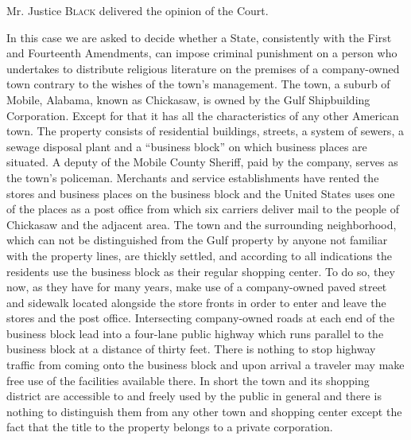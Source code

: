 
\opinion Mr. Justice \textsc{Black} delivered the opinion of the Court.

In this case we are asked to decide whether a State, consistently with the First
and Fourteenth Amendments, can impose criminal punishment on a person who
undertakes to distribute religious literature on the premises of a
company-owned town contrary to the wishes of the town's management. The town, a
suburb of Mobile, Alabama, known as Chickasaw, is owned by the Gulf
Shipbuilding Corporation. Except for that it has all the characteristics of any
other American town. The property consists of residential buildings, streets, a
system of sewers, a sewage disposal plant and a ``business block'' on which
business places are situated. A deputy of the Mobile County Sheriff, paid by
the company, serves as the town's policeman. Merchants and service
establishments have rented the stores and business places on the business block
and the United States uses one of the places as a post office from which six
carriers deliver mail to the people of Chickasaw and the adjacent area. The
town and the surrounding neighborhood, which can not be distinguished from the
Gulf property by anyone not familiar with the property lines, are thickly
settled, and according to all indications the residents use the business block
as their regular shopping center. To do so, they now, as they have for many
years, make use of a company-owned paved street and sidewalk located alongside
the store fronts in order to enter and leave the stores and the post office.
Intersecting company-owned roads at each end of the business block lead into a
four-lane public highway which runs parallel to the business block at a
distance of thirty feet. There is nothing to stop highway traffic from coming
onto the business block and upon arrival a traveler may make free use of the
facilities available there. In short the town and its shopping district are
accessible to and freely used by the public in general and there is nothing to
distinguish them from any other town and shopping center except the fact that
the title to the property belongs to a private corporation.

